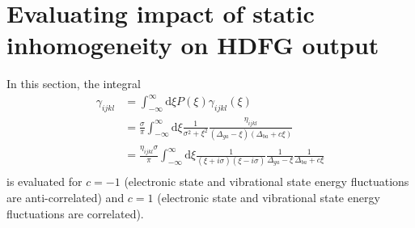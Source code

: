 \documentclass[aip, jcp, reprint, onecolumn, nofootinbib]{revtex4-2}
\begin{document}
\pagebreak

\section{Evaluating impact of static inhomogeneity on HDFG output}
In this section, the integral
\begin{equation}\label{generalcontour}
	\begin{split}
		\gamma_{ijkl} &= \int_{-\infty}^\infty \mathrm{d}\xi P(\xi) \gamma_{ijkl}(\xi)\\
		&= \frac{\sigma}{\pi}\int_{-\infty}^\infty \mathrm{d}\xi \frac{1}{\sigma^2 + \xi^2} \frac{\eta_{ijkl}}{\left(\Delta_{ga} - \xi\right)\left(\Delta_{ba}+ c\xi\right)} \\
		&= \frac{\eta_{ijkl} \sigma}{\pi} \int_{-\infty}^\infty \mathrm{d}\xi\frac{1}{(\xi + i\sigma)(\xi - i\sigma)} \frac{1}{\Delta_{ga} - \xi} \frac{1}{\Delta_{ba} + c\xi}\\
	\end{split}
\end{equation}
is evaluated for $c=-1$ (electronic state and vibrational state energy fluctuations are anti-correlated) and $c=1$ (electronic state and vibrational state energy fluctuations are correlated).
\end{document}
